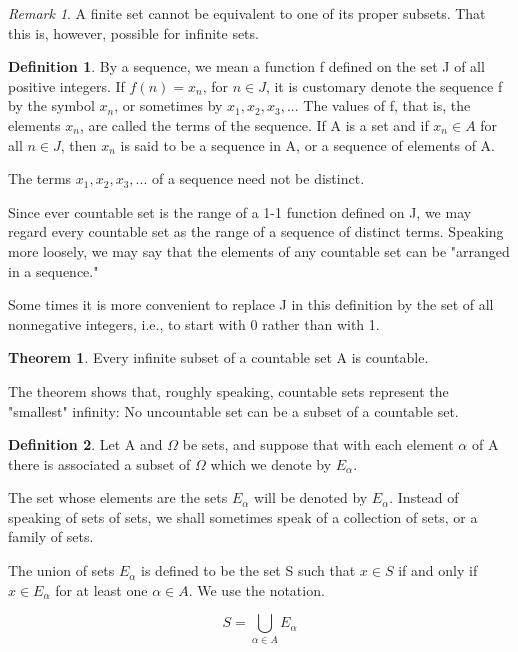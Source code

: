 \documentclass{article}
\theoremstyle{definition}
\newtheorem{defi}{Definition}
\newtheorem{theo}{Theorem}
\theoremstyle{remark}
\newtheorem{Rem}{Remark}
\begin{document}
\begin{Rem}
	A finite set cannot be equivalent to one of its proper subsets. That this is, however, possible for infinite sets. 
\end{Rem}

\begin{defi}
	By a sequence, we mean a function f defined on the set J of all positive integers. If $f(n)=x_n$, for $n\in J$, it is customary denote the sequence f by the symbol ${x_n}$, or sometimes by $x_1,x_2,x_3,...$ The values of f, that is,  the elements $x_n$, are called the terms of the sequence. If A is a set and if $x_n\in A$ for all $n\in J$, then ${x_n}$ is said to be a sequence in A, or a sequence of elements of A.
\end{defi}

The terms $x_1, x_2, x_3,...$ of a sequence need not be distinct.

Since ever countable set is the range of a 1-1 function defined on J, we may regard every countable set as the range of a sequence of distinct terms. Speaking more loosely, we may say that the elements of any countable set can be "arranged in a sequence."

Some times it is more convenient to replace J in this definition by the set of all nonnegative integers, i.e., to start with 0 rather than with 1.


\begin{theo}
	Every infinite subset of a countable set A is countable.
\end{theo}

The theorem shows that, roughly speaking, countable sets represent the "smallest" infinity: No uncountable set can be a subset of a countable set.

\begin{defi}
	Let A and $\Omega$ be sets, and suppose that with each element $\alpha$ of A there is associated a subset of $\Omega$ which we denote by $E_\alpha$.
	
	The set whose elements are the sets $E_\alpha$ will be denoted by ${E_\alpha}$. Instead of speaking of sets of sets, we shall sometimes speak of a collection of sets, or a family of sets.
	
\end{defi}

	The union of sets $E_\alpha$ is defined to be the set S such that $x\in S$ if and only if $x\in E_\alpha$ for at least one $\alpha\in A$. We use the notation.
	
	\begin{equation}
		S=\bigcup_{\alpha\in A}E_\alpha
	\end{equation}
\end{document}
